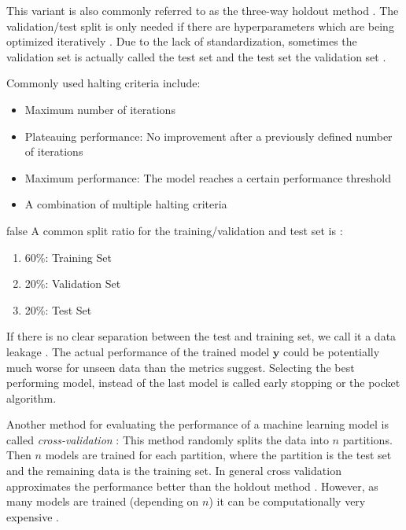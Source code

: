 \documentclass[draft,final,oneside]{vutinfth} %
\begin{document}
This variant is also commonly referred to as the three-way holdout method \cite{holdoutcrossvalidation}. The validation/test split is only needed if there are hyperparameters which are being optimized iteratively \cite{holdoutcrossvalidation}.
Due to the lack of standardization, sometimes the validation set is actually called the test set and the test set the validation set \cite{patternrecognitionandnn} \cite{anintroductiontoneuralnetworks}.

Commonly used halting criteria include:
\begin{itemize}
\item Maximum number of iterations \cite{kerashalting}
\item Plateauing performance: No improvement after a previously defined number of iterations \cite{haltingcriteria}
\item Maximum performance: The model reaches a certain performance threshold \cite{kerashalting}
\item A combination of multiple halting criteria \cite{kerashalting}
\end{itemize}

\if false
A common split ratio for the training/validation and test set is \cite{holdoutcrossvalidation}:
\begin{enumerate}
\item 60\%: Training Set
\item 20\%: Validation Set
\item 20\%: Test Set
\end{enumerate}
\fi

If there is no clear separation between the test and training set, we call it a data leakage \cite{doingdatascience}. The actual performance of the trained model $\boldsymbol{y}$ could be potentially much worse for unseen data than the metrics suggest. Selecting the best performing model, instead of the last model is called early stopping or the pocket algorithm.

Another method for evaluating the performance of a machine learning model is called \textit{cross-validation} \cite{holdoutcrossvalidation}: This method randomly splits the data into $n$ partitions. Then $n$ models are trained for each partition, where the partition is the test set and the remaining data is the training set. In general cross validation approximates the performance better than the holdout method \cite{aimodern}. However, as many models are trained (depending on $n$) it can be computationally very expensive  \cite{bishop}.
\end{document}
